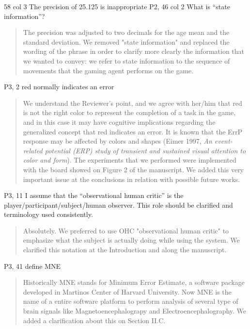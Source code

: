 \documentclass[journal,onecolumn,12pt]{IEEEtran}
\begin{document}
58 col 3 The precision of 25.125 is inappropriate P2, 46 col 2 What is “state information”?

\vspace{2em}
\begin{quotation}
{\color{blue}
The precision was adjusted to two decimals for the age mean and the standard deviation.  We removed  "state information" and replaced the wording of the phrase in order to clarify more clearly the information that we wanted to convey:  we refer to state information to the sequence of movements that the gaming agent performs on the game.
}
\end{quotation}
\vspace{2em}

P3, 2 red normally indicates an error

\vspace{2em}
\begin{quotation}
{\color{blue}
We understand the Reviewer's point, and we agree with her/him that red is not the right color to represent the completion of a task in the game, and in this case it may have cognitive implications regarding the generalized concept that red indicates an error.   It is known that the ErrP response may be affected by colors and shapes (Eimer 1997, \textit{An event-related potential (ERP) study of transient and sustained visual attention to color and form}).  The experiments that we performed were implemented with the board showed on Figure 2 of the manuscript.  We added this very important issue at the conclusions in relation with possible future works.
}
\end{quotation}
\vspace{2em}

P3, 11 I assume that the “observational human critic” is the player/participant/subject/human observer. This role should be clarified and terminology used consistently.

\vspace{2em}
\begin{quotation}
{\color{blue}
Absolutely.  We preferred to use OHC "observational human critic" to emphasize what the subject is actually doing while using the system.  We clarified this notation at the Introduction and along the manuscript.
}
\end{quotation}
\vspace{2em}

P3, 41 define MNE

\vspace{2em}
\begin{quotation}
{\color{blue}
Historically MNE stands for Minimum Error Estimate, a software package developed in Martinos Center of Harvard University.  Now MNE  is the name of a entire software platform to perform analysis of several type of brain signals like Magnetoencephalograpy and Electroencephalography.  We added a clarification about this on Section II.C.
}
\end{quotation}
\vspace{2em}
\end{document}
